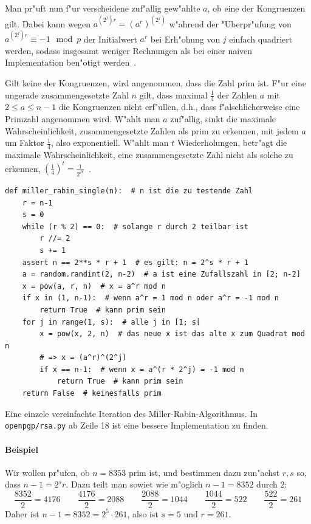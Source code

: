 \documentclass[12pt]{article}
\begin{document}
Man pr"uft nun f"ur verscheidene zuf"allig gew"ahlte $a$, ob eine der Kongruenzen gilt.
Dabei kann wegen $a^{(2^j)r} = (a^r)^{(2^j)}$ w"ahrend der "Uberpr"ufung von
$a^{(2^j)r} \equiv -1 \mod p$ der Initialwert $a^r$ bei Erh"ohung von $j$ einfach quadriert werden,
sodass insgesamt weniger Rechnungen als bei einer naiven Implementation ben"otigt werden~\cite{hac}.

Gilt keine der Kongruenzen, wird angenommen, dass die Zahl prim ist.
F"ur eine ungerade zusammengesetzte Zahl $n$ gilt,
dass maximal $\frac{1}{4}$ der Zahlen $a$ mit $2 \leq a \leq n-1$ die Kongruenzen nicht erf"ullen,
d.h., dass f"alschlicherweise eine Primzahl angenommen wird.
W"ahlt man $a$ zuf"allig, sinkt die maximale Wahrscheinlichkeit, zusammengesetzte Zahlen als prim zu erkennen,
mit jedem $a$ um Faktor $\frac{1}{4}$, also exponentiell.
W"ahlt man $t$ Wiederholungen, betr"agt die maximale Wahrscheinlichkeit, eine zusammengesetzte Zahl nicht als solche zu erkennen,
$\left(\frac{1}{4}\right)^t = \frac{1}{2^{2t}}$~\cite{hac}.

\begin{code-snip}
\begin{lstlisting}
def miller_rabin_single(n):  # n ist die zu testende Zahl
    r = n-1
    s = 0
    while (r % 2) == 0:  # solange r durch 2 teilbar ist
        r //= 2
        s += 1
    assert n == 2**s * r + 1  # es gilt: n = 2^s * r + 1
    a = random.randint(2, n-2)  # a ist eine Zufallszahl in [2; n-2]
    x = pow(a, r, n)  # x = a^r mod n
    if x in (1, n-1):  # wenn a^r = 1 mod n oder a^r = -1 mod n
        return True  # kann prim sein
    for j in range(1, s):  # alle j in [1; s[
        x = pow(x, 2, n)  # das neue x ist das alte x zum Quadrat mod n
        # => x = (a^r)^(2^j)
        if x == n-1:  # wenn x = a^(r * 2^j) = -1 mod n
            return True  # kann prim sein
    return False  # keinesfalls prim
\end{lstlisting}
\caption{Eine einzele vereinfachte Iteration des Miller-Rabin-Algorithmus.
In \texttt{openpgp/rsa.py} ab Zeile 18 ist eine bessere Implementation zu finden.}
\label{code:miller-rabin}
\end{code-snip}

\paragraph{Beispiel}
Wir wollen pr"ufen, ob $n = 8353$ prim ist, und bestimmen dazu zun"achst $r, s$ so, dass $n - 1 = 2^s r$.
Dazu teilt man sowiet wie m"oglich $n-1 = 8352$ durch 2:
\[ \frac{8352}{2} = 4176 \qquad \frac{4176}{2} = 2088 \qquad \frac{2088}{2} = 1044 \qquad
\frac{1044}{2} = 522 \qquad \frac{522}{2} = 261 \]
Daher ist $n-1 = 8352 = 2^5 \cdot 261$, also ist $s = 5$ und $r = 261$.
\end{document}
